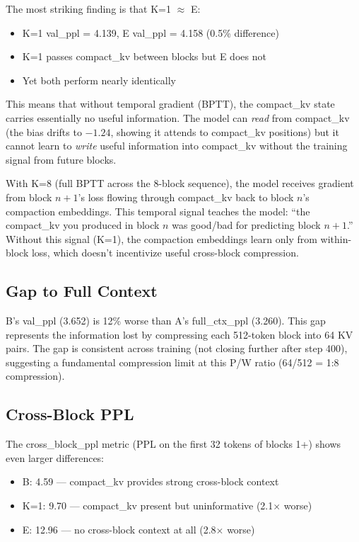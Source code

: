 \documentclass[11pt]{article}
\begin{document}
The most striking finding is that K=1 $\approx$ E:
\begin{itemize}
    \item K=1 val\_ppl = 4.139, E val\_ppl = 4.158 (0.5\% difference)
    \item K=1 passes compact\_kv between blocks but E does not
    \item Yet both perform nearly identically
\end{itemize}

This means that without temporal gradient (BPTT), the compact\_kv state carries
essentially no useful information. The model can \emph{read} from compact\_kv (the bias
drifts to $-1.24$, showing it attends to compact\_kv positions) but it cannot learn to
\emph{write} useful information into compact\_kv without the training signal from future
blocks.

With K=8 (full BPTT across the 8-block sequence), the model receives gradient from
block $n+1$'s loss flowing through compact\_kv back to block $n$'s compaction embeddings.
This temporal signal teaches the model: ``the compact\_kv you produced in block $n$ was
good/bad for predicting block $n+1$.'' Without this signal (K=1), the compaction
embeddings learn only from within-block loss, which doesn't incentivize useful
cross-block compression.

\subsection{Gap to Full Context}

B's val\_ppl (3.652) is 12\% worse than A's full\_ctx\_ppl (3.260). This gap represents
the information lost by compressing each 512-token block into 64 KV pairs. The gap
is consistent across training (not closing further after step 400), suggesting a
fundamental compression limit at this P/W ratio (64/512 = 1:8 compression).

\subsection{Cross-Block PPL}

The cross\_block\_ppl metric (PPL on the first 32 tokens of blocks 1+) shows even
larger differences:
\begin{itemize}
    \item B: 4.59 --- compact\_kv provides strong cross-block context
    \item K=1: 9.70 --- compact\_kv present but uninformative (2.1$\times$ worse)
    \item E: 12.96 --- no cross-block context at all (2.8$\times$ worse)
\end{itemize}
\end{document}
